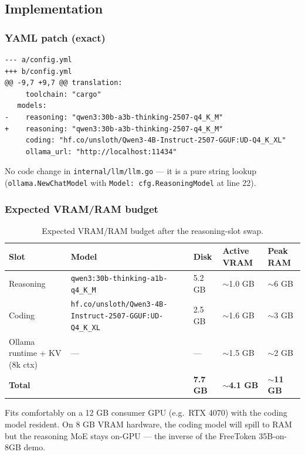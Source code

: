 \subsection{Implementation}

\subsubsection{YAML patch (exact)}

\begin{verbatim}
--- a/config.yml
+++ b/config.yml
@@ -9,7 +9,7 @@ translation:
     toolchain: "cargo"
   models:
-    reasoning: "qwen3:30b-a3b-thinking-2507-q4_K_M"
+    reasoning: "qwen3:30b-a3b-thinking-2507-q4_K_M"
     coding: "hf.co/unsloth/Qwen3-4B-Instruct-2507-GGUF:UD-Q4_K_XL"
     ollama_url: "http://localhost:11434"
\end{verbatim}

No code change in \texttt{internal/llm/llm.go} --- it is a pure string lookup
(\texttt{ollama.NewChatModel} with \texttt{Model: cfg.ReasoningModel} at line 22).

\subsubsection{Expected VRAM/RAM budget}

\begin{table}[h]
\centering
\begin{tabular}{lllll}
\toprule
Slot & Model & Disk & Active VRAM & Peak RAM \\
\midrule
Reasoning & \texttt{qwen3:30b-thinking-a1b-q4\_K\_M} & 5.2 GB & $\sim$1.0 GB & $\sim$6 GB \\
Coding & \texttt{hf.co/unsloth/Qwen3-4B-Instruct-2507-GGUF:UD-Q4\_K\_XL} & 2.5 GB & $\sim$1.6 GB & $\sim$3 GB \\
Ollama runtime + KV (8k ctx) & --- & --- & $\sim$1.5 GB & $\sim$2 GB \\
\midrule
\textbf{Total} & & \textbf{7.7 GB} & \textbf{$\sim$4.1 GB} & \textbf{$\sim$11 GB} \\
\bottomrule
\end{tabular}
\caption{Expected VRAM/RAM budget after the reasoning-slot swap.}
\end{table}

Fits comfortably on a 12 GB consumer GPU (e.g.\ RTX 4070) with the coding
model resident. On 8 GB VRAM hardware, the coding model will spill to RAM but
the reasoning MoE stays on-GPU --- the inverse of the FreeToken 35B-on-8GB demo.


